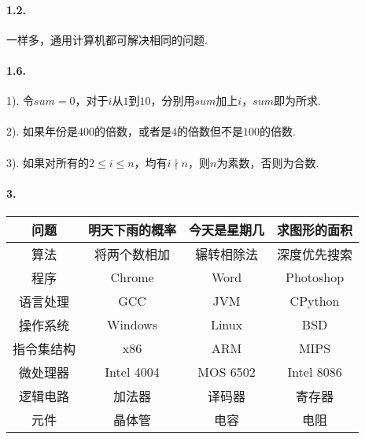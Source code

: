 \documentclass[UTF8]{ctexart}
\begin{document}
\pagestyle{main}

\paragraph{1.2.}
一样多，通用计算机都可解决相同的问题.

\paragraph{1.6.}
1).
令$sum=0$，对于$i$从$1$到$10$，分别用$sum$加上$i$，$sum$即为所求.
\\\\
2).
如果年份是$400$的倍数，或者是$4$的倍数但不是$100$的倍数.
\\\\
3).
如果对所有的$2\le i\le n$，均有$i\nmid n$，则$n$为素数，否则为合数.

\paragraph{3.}
\begin{center}
	\begin{tabular}{cccc}
		\toprule
		问题       & 明天下雨的概率 & 今天是星期几 & 求图形的面积 \\
		\midrule
		算法       & 将两个数相加   & 辗转相除法   & 深度优先搜索 \\
		\midrule
		程序       & Chrome         & Word         & Photoshop    \\
		\midrule
		语言处理   & GCC            & JVM          & CPython      \\
		\midrule
		操作系统   & Windows        & Linux        & BSD          \\
		\midrule
		指令集结构 & x86            & ARM          & MIPS         \\
		\midrule
		微处理器   & Intel 4004     & MOS 6502     & Intel 8086   \\
		\midrule
		逻辑电路   & 加法器         & 译码器       & 寄存器       \\
		\midrule
		元件       & 晶体管         & 电容         & 电阻         \\
		\bottomrule
	\end{tabular}
\end{center}
\end{document}

